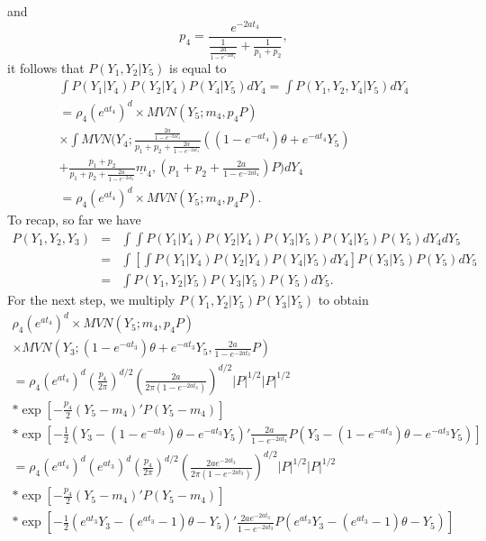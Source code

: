 \documentclass[12pt]{article}
\begin{document}
and 
\begin{equation}
p_4 = \frac{e^{-2at_4}}{  \frac{1}{\frac{2a}{1-e^{-2at_4}}}  + \frac{1}{p_1 + p_2} } , 
\end{equation}
it follows that
$P(Y_1,Y_2 | Y_5)$ is equal to
\begin{eqnarray}
 \int  P(Y_1 | Y_4) P(Y_2 | Y_4) P(Y_4 | Y_5) dY_4 = \int P(Y_1,Y_2,Y_4 | Y_5) dY_4 \\
 =  \rho_4 (e^{at_4} )^d  \times MVN \left( Y_5 ; m_4, p_4 P  \right)  \\
 \times \int MVN (Y_4 ; \frac{ \frac{2a}{1-e^{-2at_4}}  }{p_1+p_2 + \frac{2a}{1-e^{-2at_4}}  }( (1 - e^{-at_4}) \theta + e^{-at_4} Y_5 ) \\
 + \frac{  p_1 +p_2}{ p_1+p_2 + \frac{2a}{1-e^{-2at_4}}  } \underline{m}_4, 
 \left( p_1 + p_2 + \frac{2a}{1-e^{-2at_4}} \right) P ) dY_4 \\
 =  \rho_4 (e^{at_4} )^d \times MVN \left( Y_5 ; m_4, p_4 P  \right) .
\end{eqnarray}
To recap, so far we have
\begin{eqnarray}
P(Y_1,Y_2,Y_3) & = & \int \int P(Y_1 | Y_4) P(Y_2 | Y_4)  P(Y_3 | Y_5) P(Y_4 | Y_5) P(Y_5) dY_4 dY_5 \\
& = & \int \left[ \int P(Y_1 | Y_4) P(Y_2 | Y_4)  P(Y_4 | Y_5) dY_4 \right] P(Y_3 | Y_5) P(Y_5) dY_5 \\
& = & \int P(Y_1,Y_2 | Y_5) P(Y_3 | Y_5) P(Y_5) dY_5.
\end{eqnarray}
For the next step, we multiply $P(Y_1,Y_2 | Y_5) P(Y_3 | Y_5)$ to obtain
\begin{eqnarray}
\rho_4 ( e^{at_4} )^d \times MVN ( Y_5 ; m_4, p_4 P ) \\
 \times  MVN \left( Y_3; (1 - e^{-at_3}) \theta + e^{-at_3} Y_5  , \frac{2a}{1-e^{-2at_3}} P \right)  \\
 =  \rho_4 ( e^{at_4} )^d \left( \frac{p_4}{2 \pi} \right) ^{d/2}  \left( \frac{2a}{ 2 \pi (1-e^{-2at_3}) } \right) ^{d/2} |P|^{1/2} |P|^{1/2}  \\
 * \exp \left[ -\frac{p_4}{2} \left( Y_5  - m_4  \right)' P \left( Y_5 - m_4  \right)  \right] \\
 * \exp \left[ -\frac{1}{2} \left(Y_3 - (1 - e^{-at_3}) \theta - e^{-at_3} Y_5 \right)' \frac{2a}{1-e^{-2at_3}}P \left( Y_3 - (1 - e^{-at_3}) \theta - e^{-at_3} Y_5  \right)   \right] \\
=  \rho_4 ( e^{at_4} )^d ( e^{at_3} )^d  \left( \frac{p_4}{2 \pi} \right) ^{d/2}  \left( \frac{2a e^{-2at_3}}{ 2 \pi (1-e^{-2at_3}) } \right) ^{d/2} |P|^{1/2} |P|^{1/2}  \\
 * \exp \left[ -\frac{p_4}{2} \left( Y_5  - m_4  \right)' P \left( Y_5 - m_4  \right)  \right] \\
 * \exp \left[ -\frac{1}{2} \left(e^{at_3} Y_3 - (e^{at_3} - 1) \theta - Y_5 \right)' \frac{2a e^{-2at_3} }{1-e^{-2at_3}}P \left( e^{at_3} Y_3 - (e^{at_3} - 1) \theta - Y_5  \right)   \right] 
\end{eqnarray}
\end{document}
